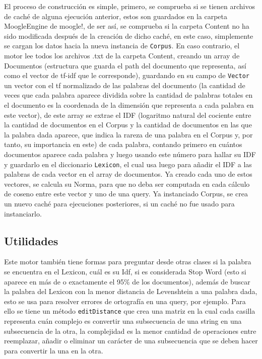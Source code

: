 \documentclass[a4paper, 12pt]{article}
\begin{document}
El proceso de construcción es simple, primero, se comprueba si se
tienen archivos de caché de alguna ejecución anterior, estos son guardados en la
carpeta MoogleEngine de moogle!, de ser así, se comprueba si la carpeta
Content no ha sido modificada después de la creación de dicho caché, en este
caso, simplemente se cargan los datos hacia la nueva instancia de \texttt{Corpus}. En
caso contrario, el motor lee todos los archivos .txt de la carpeta Content,
creando un array de Documentos (estructura que guarda el path del documento
que representa, así como el vector de tf-idf que le corresponde), guardando en
su campo de \texttt{Vector} un vector con el tf normalizado de las palabras del
documento (la cantidad de veces que cada palabra aparece dividida sobre la
cantidad de palabras totales en el documento es la coordenada de la dimensión
que representa a cada palabra en este vector), de este array se extrae el IDF
(logaritmo natural del cociente entre la cantidad de documentos en el Corpus y
la cantidad de documentos en las que la palabra dada aparece, que indica la
rareza de una palabra en el Corpus y, por tanto, su importancia en este) de cada
palabra, contando primero en cuántos documentos aparece cada palabra y luego
usando este número para hallar su IDF y guardarlo en el diccionario \texttt{Lexicon}, el
cual usa luego para añadir el IDF a las palabras de cada vector en el array de
documentos. Ya creado cada uno de estos vectores, se calcula su Norma, para
que no deba ser computada en cada cálculo de coseno entre este vector y uno de
una query. Ya instanciado Corpus, se crea un nuevo caché para ejecuciones
posteriores, si un caché no fue usado para instanciarlo.

\subsection{Utilidades}

Este motor también tiene formas para preguntar desde otras clases si la
palabra se encuentra en el Lexicon, cuál es su Idf, si es considerada Stop Word
(esto si aparece en más de o exactamente el 95\% de los documentos), además de buscar la palabra del Lexicon con la menor distancia de Levenshtein a una
palabra dada, esto se usa para resolver errores de ortografía en una query, por
ejemplo. Para ello se tiene un método \texttt{editDistance} que crea una matriz en la
cual cada casilla representa cuán complejo es convertir una subsecuencia de una
string en una subsecuencia de la otra, la complejidad es la menor cantidad de
operaciones entre reemplazar, añadir o eliminar un carácter de una subsecuencia
que se deben hacer para convertir la una en la otra.
\end{document}
